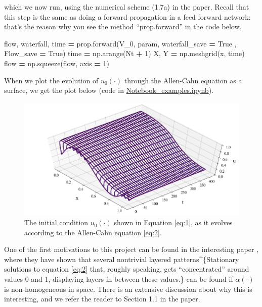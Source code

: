 \documentclass[openany,twoside]{book}
\newenvironment{Shaded}{\begin{snugshade}}{\end{snugshade}}
\newcommand{\DecValTok}[1]{\textcolor[rgb]{0.00,0.00,0.81}{#1}}
\newcommand{\NormalTok}[1]{#1}
\newcommand{\OperatorTok}[1]{\textcolor[rgb]{0.81,0.36,0.00}{\textbf{#1}}}
\newcommand{\VariableTok}[1]{\textcolor[rgb]{0.00,0.00,0.00}{#1}}
\begin{document}
which we now run, using the numerical scheme (1.7a) in the paper. Recall that this step is the same as doing a forward propagation in a feed forward network: that's the reason why you see the method ``prop.forward'' in the code below.

\begin{Shaded}
\begin{Highlighting}[]
\NormalTok{flow, waterfall, time }\OperatorTok{=}\NormalTok{ prop.forward(V_0, param, waterfall_save }\OperatorTok{=} \VariableTok{True}\NormalTok{ , Flow_save }\OperatorTok{=} \VariableTok{True}\NormalTok{)}
\NormalTok{time }\OperatorTok{=}\NormalTok{ np.arange(Nt }\OperatorTok{+} \DecValTok{1}\NormalTok{)}
\NormalTok{X, Y }\OperatorTok{=}\NormalTok{ np.meshgrid(x, time)}
\NormalTok{flow }\OperatorTok{=}\NormalTok{ np.squeeze(flow, axis }\OperatorTok{=} \DecValTok{1}\NormalTok{)}
\end{Highlighting}
\end{Shaded}

When we plot the evolution of \(u_0(\cdot)\) through the Allen-Cahn equation as a surface, we get the plot below (code in \href{https://github.com/rafael-a-monteiro-math/Binary_classification_phase_separation/blob/master/Notebook_PSBC_examples.ipynb}{Notebook\_examples.ipynb}).

\begin{figure}
\centering
\includegraphics{figures/output_11_0.png}
\caption{The initial condition \(u_0(\cdot)\) shown in Equation \eqref{eq:1}, as it evolves according to the Allen-Cahn equation \eqref{eq:2}.}
\end{figure}

One of the first motivations to this project can be found in the interesting paper \citep{Ang_Mal}, where they have shown that several nontrivial layered patterns\^{}\{Stationary solutions to equation \eqref{eq:2} that, roughly speaking, gets ``concentrated'' around values 0 and 1, displaying layers in between these values.\} can be found if \(\alpha(\cdot)\) is non-homogeneous in space. There is an extensive discussion about why this is interesting, and we refer the reader to Section 1.1 in the paper.
\end{document}
